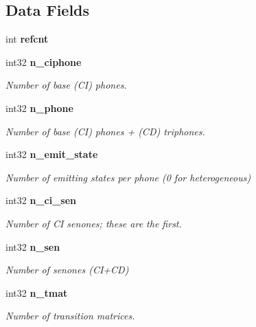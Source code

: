 \subsection*{Data Fields}
\begin{DoxyCompactItemize}
\item 
\mbox{\label{structbin__mdef__s_a35282c2ff4e75fd87186e38dbf14e7f1}} 
int {\bfseries refcnt}
\item 
\mbox{\label{structbin__mdef__s_a84d5f7acc6d85ba8c7611945f9c5e4e7}} 
int32 \textbf{ n\+\_\+ciphone}
\begin{DoxyCompactList}\small\item\em Number of base (CI) phones. \end{DoxyCompactList}\item 
\mbox{\label{structbin__mdef__s_ad746dbb3f8108f575a95182f96b4b18f}} 
int32 \textbf{ n\+\_\+phone}
\begin{DoxyCompactList}\small\item\em Number of base (CI) phones + (CD) triphones. \end{DoxyCompactList}\item 
\mbox{\label{structbin__mdef__s_a2ad87254182be424ac6ff1234274f134}} 
int32 \textbf{ n\+\_\+emit\+\_\+state}
\begin{DoxyCompactList}\small\item\em Number of emitting states per phone (0 for heterogeneous) \end{DoxyCompactList}\item 
\mbox{\label{structbin__mdef__s_ad7c318d6db85fd4b8ac13a81c145bbb8}} 
int32 \textbf{ n\+\_\+ci\+\_\+sen}
\begin{DoxyCompactList}\small\item\em Number of CI senones; these are the first. \end{DoxyCompactList}\item 
\mbox{\label{structbin__mdef__s_a3d1c202165d8e5e153a73d708ca28109}} 
int32 \textbf{ n\+\_\+sen}
\begin{DoxyCompactList}\small\item\em Number of senones (C\+I+\+CD) \end{DoxyCompactList}\item 
\mbox{\label{structbin__mdef__s_a979557ad4f8369e84d93f633512345ca}} 
int32 \textbf{ n\+\_\+tmat}
\begin{DoxyCompactList}\small\item\em Number of transition matrices. \end{DoxyCompactList}\item 

\end{DoxyCompactItemize}
